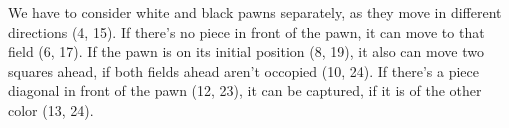 We have to consider white and black pawns separately, as they move in different directions (4, 15).
If there's no piece in front of the pawn, it can move to that field (6, 17).
If the pawn is on its initial position (8, 19), it also can move two squares ahead, if both fields
ahead aren't occopied (10, 24).
If there's a piece diagonal in front of the pawn (12, 23), it can be captured, if it is of the
other color (13, 24).
